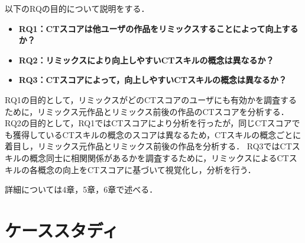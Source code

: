 \documentclass[11pt]{jreport}
\begin{document}
以下のRQの目的について説明をする．
\begin{itemize}
  \item\textbf{RQ1：CTスコアは他ユーザの作品をリミックスすることによって向上するか？}
  \item\textbf{RQ2：リミックスにより向上しやすいCTスキルの概念は異なるか？}
  \item\textbf{RQ3：CTスコアによって，向上しやすいCTスキルの概念は異なるか？}
\end{itemize}

RQ1の目的として，リミックスがどのCTスコアのユーザにも有効かを調査するために，リミックス元作品とリミックス前後の作品のCTスコアを分析する．
RQ2の目的として，RQ1ではCTスコアにより分析を行ったが，同じCTスコアでも獲得しているCTスキルの概念のスコアは異なるため，CTスキルの概念ごとに着目し，リミックス元作品とリミックス前後の作品を分析する．
RQ3ではCTスキルの概念同士に相関関係があるかを調査するために，リミックスによるCTスキルの各概念の向上をCTスコアに基づいて視覚化し，分析を行う．

詳細については4章，5章，6章で述べる．

\chapter{ケーススタディ}
\end{document}
